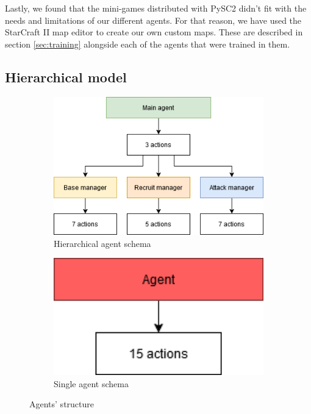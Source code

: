 Lastly, we found that the mini-games distributed with PySC2 didn't fit with the needs and limitations of our different agents. For that reason, we have used the StarCraft II map editor to create our own custom maps. These are described in section \ref{sec:training} alongside each of the agents that were trained in them.

\subsection{Hierarchical model}

\begin{figure}[t]
    \centering
    \begin{subfigure}[b]{0.45\textwidth}
        \includegraphics[width=1\textwidth]{figs/multi_agent_schema.png}
        \caption{Hierarchical agent schema}
        \label{fig:multi_schema}
    \end{subfigure}
    \hspace{1cm}
    \begin{subfigure}[b]{0.25\textwidth}
        \includegraphics[width=1\textwidth]{figs/single_agent_schema.png}
        \caption{Single agent schema}
        \label{fig:single_schema}
    \end{subfigure}
    \hfill
    \caption{Agents' structure}
\end{figure}

